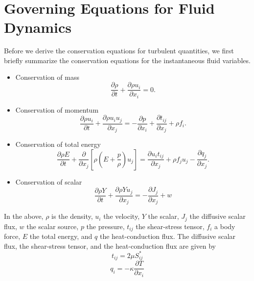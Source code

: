 \documentclass[oneside,a4paper,11pt]{report}
\begin{document}
\chapter{Governing Equations for Fluid Dynamics}
%
Before we derive the conservation equations for turbulent quantities, we first briefly summarize the conservation equations for the instantaneous fluid variables.
\begin{itemize}
\item Conservation of mass
\begin{equation}
    \label{eq:cons_mass}
    \frac{\partial \rho}{\partial t} + \frac{ \partial \rho u_i}{ \partial x_i} = 0.
\end{equation}
\item Conservation of momentum
\begin{equation}
    \label{eq:cons_momentum}
    \frac{\partial \rho u_i}{\partial t}+\frac{\partial \rho u_i u_j}{\partial x_j} =-\frac{\partial p}{\partial x_i} + \frac{\partial t_{ij}}{\partial x_j} + \rho f_i.
\end{equation}
\item Conservation of total energy
\begin{equation}
    \label{eq:cons_energy}
    \frac{\partial \rho E}{\partial t} + \frac{\partial}{\partial x_j} \left [ \rho \left ( E + \frac{p}{\rho} \right ) u_j \right ] = \frac{\partial u_i t_{ij}}{\partial x_j} + \rho f_j u_j - \frac{\partial q_j}{\partial x_j}.
\end{equation}
\item Conservation of scalar
\begin{equation}
    \label{eq:cons_scalar}
    \frac{\partial \rho Y}{\partial t} + \frac{\partial \rho Y u_j}{\partial x_j} = -\frac{\partial J_j}{\partial x_j} + w
\end{equation}
\end{itemize}
In the above, $\rho$ is the density, $u_i$ the velocity, $Y$ the scalar, $J_j$ the diffusive scalar flux, $w$ the scalar source, $p$ the pressure, $t_{ij}$ the shear-stress tensor, $f_i$ a body force, $E$ the total energy, and $q$ the heat-conduction flux. The diffusive scalar flux, the shear-stress tensor, and the heat-conduction flux are given by
\begin{equation}
\label{eq:shear_stress}
    t_{ij} = 2\mu S_{ij}^*
\end{equation}
\begin{equation}
    q_i = -\kappa \frac{\partial T}{\partial x_i}
\end{equation}
\end{document}
